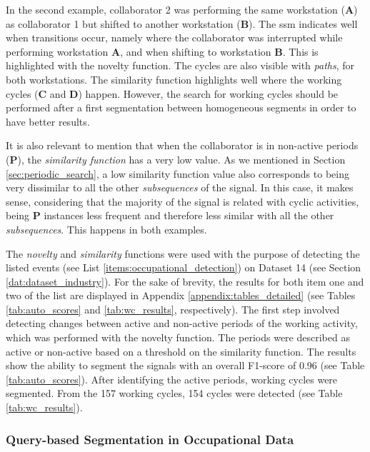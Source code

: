 In the second example, collaborator 2 was performing the same workstation  (\textbf{A}) as collaborator 1 but shifted to another workstation (\textbf{B}). The \gls{ssm} indicates well when transitions occur, namely where the collaborator was interrupted while performing workstation \textbf{A}, and when shifting to workstation \textbf{B}. This is highlighted with the novelty function. The cycles are also visible with \textit{paths}, for both workstations. The similarity function highlights well where the working cycles (\textbf{C} and \textbf{D}) happen. However, the search for working cycles should be performed after a first segmentation between homogeneous segments in order to have better results. 

It is also relevant to mention that when the collaborator is in non-active periods (\textbf{P}), the \textit{similarity function} has a very low value. As we mentioned in Section \ref{sec:periodic_search}, a low similarity function value also corresponds to being very dissimilar to all the other \textit{subsequences} of the signal. In this case, it makes sense, considering that the majority of the signal is related with cyclic activities, being \textbf{P} instances less frequent and therefore less similar with all the other \textit{subsequences}. This happens in both examples.

The \textit{novelty} and \textit{similarity} functions were used with the purpose of detecting the listed events (see List \ref{items:occupational_detection}) on Dataset 14 (see Section \ref{dat:dataset_industry}). For the sake of brevity, the results for both item one and two of the list are displayed in Appendix \ref{appendix:tables_detailed} (see Tables \ref{tab:auto_scores} and \ref{tab:wc_results}, respectively). The first step involved detecting changes between active and non-active periods of the working activity, which was performed with the novelty function. The periods were described as active or non-active based on a threshold on the similarity function. The results show the ability to segment the signals with an overall F1-score of 0.96 (see Table \ref{tab:auto_scores}). After identifying the active periods, working cycles were segmented. From the 157 working cycles, 154 cycles were detected (see Table \ref{tab:wc_results}). 

\subsubsection{Query-based Segmentation in Occupational Data}


